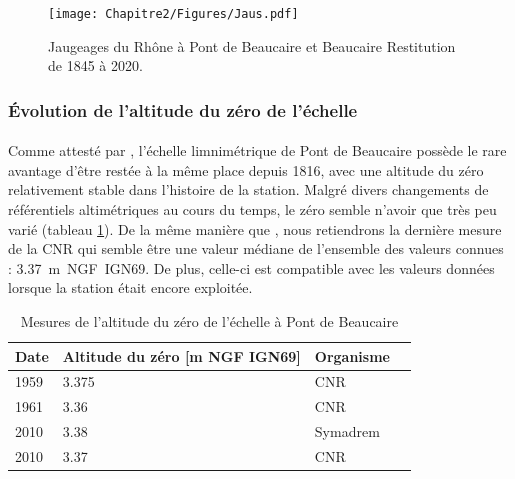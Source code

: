     \begin{figure}[h]
	\centering
		\texttt{[image: Chapitre2/Figures/Jaus.pdf]}
        \caption{Jaugeages du Rhône à Pont de Beaucaire et Beaucaire Restitution de 1845 à 2020.}	
		\label{fig:JauAll}
	\end{figure}
   
\FloatBarrier

	\subsubsection{Évolution de l'altitude du zéro de l'échelle}
    
    \paragraph{} Comme attesté par \citet{pichard_hauteurs_2013}, l'échelle limnimétrique de Pont de Beaucaire possède le rare avantage d'être restée à la même place depuis 1816, avec une altitude du zéro relativement stable dans l'histoire de la station. Malgré divers changements de référentiels altimétriques au cours du temps, le zéro semble n'avoir que très peu varié (tableau \ref{tab:zeroPt}). De la même manière que \citet{bard_actualisation_2018}, nous retiendrons la dernière mesure de la CNR qui semble être une valeur médiane de l'ensemble des valeurs connues : 3.37~m~NGF~IGN69. De plus, celle-ci est compatible avec les valeurs données lorsque la station était encore exploitée.

            \begin{table}[h]
                \centering
                \caption{Mesures de l'altitude du zéro de l'échelle à Pont de Beaucaire}
            	\label{tab:zeroPt}
                \begin{tabular}{| m{1.5cm} | m{3cm}| m{3cm} | m{2cm} |} 
                    \hline
                    Date & Altitude du zéro [m NGF IGN69] & Organisme \\
                    \hline
                    1959 &	3.375 &	CNR\\
                    \hline
                    1961 &	3.36 &	CNR\\
                    \hline
                    2010 &	3.38 &	Symadrem\\
                    \hline
                    2010 &	3.37 &	CNR\\
                    \hline
            \end{tabular}
        \end{table}


